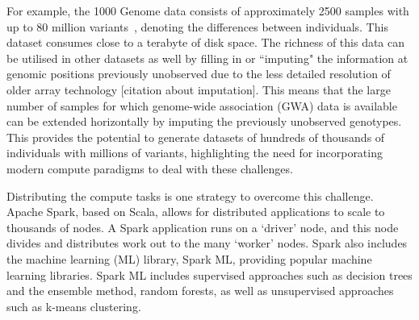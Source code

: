 \documentclass[10pt,letterpaper]{article}
\begin{document}
For example, the 1000 Genome data consists of approximately 2500 samples with up to 80 million variants~\cite{1KG2012},
denoting the differences between individuals.  This dataset consumes close to a terabyte of disk space.  The richness of
this data can be utilised in other datasets as well by filling in or ``imputing" the information at genomic positions
previously unobserved due to the less detailed resolution of older array technology [citation about imputation].  This
means that the large number of samples for which genome-wide association (GWA) data is available~\cite{Welter2013} can
be extended horizontally by imputing the previously unobserved genotypes.  This provides the potential to generate
datasets of hundreds of thousands of individuals with millions of variants, highlighting the need for incorporating
modern compute paradigms to deal with these challenges.



Distributing the compute tasks is one strategy to overcome this challenge. Apache Spark, based on Scala, allows for  
distributed applications to scale to thousands of nodes.  A Spark application runs on a `driver' node, and
this node divides and distributes work out to the many `worker' nodes.  Spark also includes the machine learning (ML)
library, Spark ML, providing popular machine learning libraries.  Spark ML includes supervised approaches such as
decision trees and the ensemble method, random forests, as well as unsupervised approaches such as k-means clustering.
\end{document}
